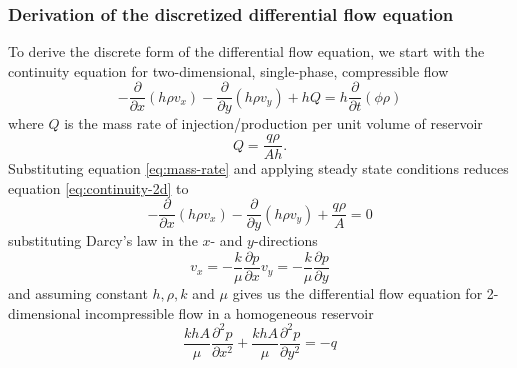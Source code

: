 \subsubsection{Derivation of the discretized differential flow equation} %
\label{ssub:derivation}
To derive the discrete form of the differential flow equation, we  start with the continuity equation for two-dimensional, single-phase, compressible flow \cite{Peaceman1977Fundamentals}
\begin{equation}
    \label{eq:continuity-2d}
    - \frac{\partial}{\partial x} \left( h\rho v_x \right) - \frac{\partial}{\partial y} \left( h\rho v_y \right) + hQ = h \frac{\partial }{\partial t} \left( \phi \rho \right)
\end{equation}
where $Q$ is the mass rate of injection/production per unit volume of reservoir
\begin{equation}
    \label{eq:mass-rate}
    Q = \frac{q\rho}{Ah}.
\end{equation}
Substituting equation \eqref{eq:mass-rate} and applying steady state conditions reduces equation \eqref{eq:continuity-2d} to
\begin{equation}
    - \frac{\partial}{\partial x} \left( h\rho v_x \right) - \frac{\partial}{\partial y} \left( h\rho v_y \right) + \frac{q\rho}{A} = 0
\end{equation}
substituting Darcy's law in the $x$- and $y$-directions \cite{Peaceman1977Fundamentals}
\begin{subequations}
    \begin{equation}
        v_x = -\frac{k}{\mu} \frac{\partial p}{\partial x}
    \end{equation}
    \begin{equation}
        v_y = -\frac{k}{\mu} \frac{\partial p}{\partial y}
    \end{equation}
\end{subequations}
and assuming constant $h,\rho,k$ and $\mu$ gives us the differential flow equation for 2-dimensional incompressible flow in a homogeneous reservoir
\begin{equation}
    \label{eq:differential-flow}
    \frac{khA}{\mu} \frac{\partial^2 p}{\partial x^2}  + \frac{khA}{\mu} \frac{\partial^2 p}{\partial y^2} = -q
\end{equation}

